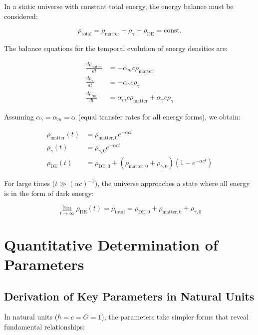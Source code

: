 \documentclass[a4paper,12pt]{article}
\theoremstyle{definition}
\theoremstyle{remark}
\begin{document}
	In a static universe with constant total energy, the energy balance must be considered:
	
	\begin{equation}
		\rho_{\text{total}} = \rho_{\text{matter}} + \rho_{\gamma} + \rho_{\text{DE}} = \text{const.}
	\end{equation}
	
	The balance equations for the temporal evolution of energy densities are:
	
	\begin{align}
		\frac{d\rho_{\text{matter}}}{dt} &= -\alpha_{m} c \rho_{\text{matter}} \\
		\frac{d\rho_{\gamma}}{dt} &= -\alpha_{\gamma} c \rho_{\gamma} \\
		\frac{d\rho_{\text{DE}}}{dt} &= \alpha_{m} c \rho_{\text{matter}} + \alpha_{\gamma} c \rho_{\gamma}
	\end{align}
	
	Assuming \(\alpha_{\gamma} = \alpha_{m} = \alpha\) (equal transfer rates for all energy forms), we obtain:
	
	\begin{align}
		\rho_{\text{matter}}(t) &= \rho_{\text{matter},0} e^{-\alpha c t} \\
		\rho_{\gamma}(t) &= \rho_{\gamma,0} e^{-\alpha c t} \\
		\rho_{\text{DE}}(t) &= \rho_{\text{DE},0} + (\rho_{\text{matter},0} + \rho_{\gamma,0})(1 - e^{-\alpha c t})
	\end{align}
	
	For large times (\(t \gg (\alpha c)^{-1}\)), the universe approaches a state where all energy is in the form of dark energy:
	
	\begin{equation}
		\lim_{t \rightarrow \infty} \rho_{\text{DE}}(t) = \rho_{\text{total}} = \rho_{\text{DE},0} + \rho_{\text{matter},0} + \rho_{\gamma,0}
	\end{equation}
	
	\section{Quantitative Determination of Parameters}
	
	\subsection{Derivation of Key Parameters in Natural Units}
	
	In natural units (\(\hbar = c = G = 1\)), the parameters take simpler forms that reveal fundamental relationships:
	
\end{document}
